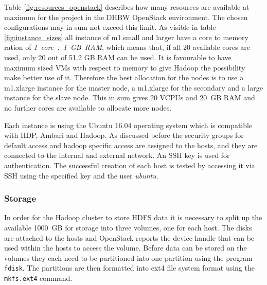 
Table \ref{fig:resources_openstack} describes how many resources are available at maximum for the project in the \ac{DHBW} OpenStack environment. The chosen configurations may in sum not exceed this limit.
As visible in table \ref{fig:instance_sizes} all instance of m1.small and larger have a core to memory ration of \emph{1~core~:~1~GB~RAM}, which means that, if all 20 available cores are used, only 20 out of 51.2 GB RAM  can be used. It is favourable to have maximum sized \acp{VM} with respect to memory to give Hadoop the possibility make better use of it.
Therefore the best allocation for the nodes is to use a m1.xlarge instance for the master node, a m1.xlarge for the secondary and a large instance for the slave node.
This in sum gives 20 \acp{VCPU} and 20~\ac{GB} \ac{RAM} and no further cores are available to allocate more nodes.


Each instance is using the Ubuntu 16.04 operating system which is compatible with \ac{HDP}, Ambari and Hadoop. As discussed before the security groups for default access and hadoop specific access are assigned to the hosts, and they are connected to the internal and external network. An \ac{SSH} key is used for authentication.
The successful creation of each host is tested by accessing it via \ac{SSH} using the specified key and the user \emph{ubuntu}.


\subsubsection{Storage}

In order for the Hadoop cluster to store \ac{HDFS} data it is necessary to split up the available 1000~\ac{GB} for storage into three volumes, one for each host.
The disks are attached to the hosts and OpenStack reports the device handle that can be 
used within the hosts to access the volume.
Before data can be stored on the volumes they each need to be partitioned into one partition using the program \texttt{fdisk}. The partitions are then formatted into ext4 file system format using the \texttt{mkfs.ext4} command.

